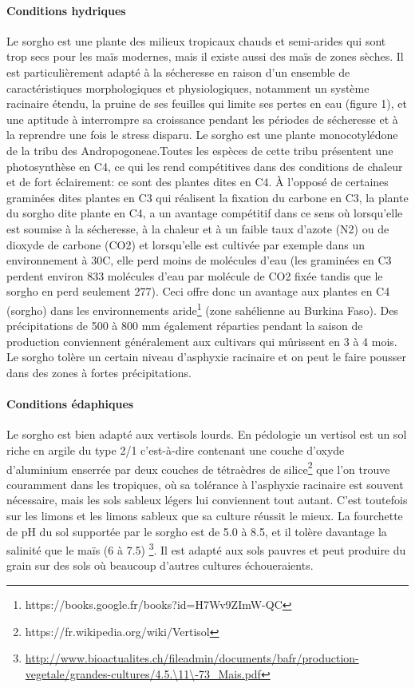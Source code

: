 \documentclass[a4paper,11pt]{article}
\begin{document}
\paragraph{Conditions hydriques} Le sorgho est une plante des milieux
tropicaux chauds et semi-arides qui sont trop secs pour les maïs
modernes, mais il existe aussi des maïs de zones sèches. Il est
particulièrement adapté à la sécheresse en raison d’un ensemble de
caractéristiques morphologiques et physiologiques, notamment un
système racinaire étendu, la pruine de ses feuilles qui limite ses
pertes en eau (figure 1), et une aptitude à interrompre sa
croissance pendant les périodes de sécheresse et à la reprendre une
fois le stress disparu. Le sorgho est une plante monocotylédone de la
tribu des Andropogoneae.Toutes les espèces de cette tribu présentent une photosynthèse en C4, ce qui les rend compétitives dans des conditions de chaleur et de fort éclairement: ce sont des plantes dites en C4. À l’opposé de certaines graminées dites plantes en C3 qui réalisent la fixation du carbone en C3, la plante du sorgho dite plante en C4, a un avantage compétitif dans ce sens où lorsqu’elle est soumise à la sécheresse, à la chaleur et à un faible taux d’azote (N2) ou de dioxyde de carbone (CO2) et lorsqu’elle est cultivée par exemple dans un environnement à 30\degree{}C, elle perd moins de molécules d’eau (les graminées en C3 perdent environ 833 molécules d’eau par molécule de CO2 fixée tandis que le sorgho en perd seulement 277). Ceci offre donc un
avantage aux plantes en C4 (sorgho) dans les environnements aride\footnote{https://books.google.fr/books?id=H7Wv9ZImW-QC}
(zone sahélienne au Burkina Faso). Des précipitations de 500 à 800 mm également réparties pendant la saison de production conviennent généralement aux cultivars qui mûrissent en 3 à 4 mois. Le sorgho
tolère un certain niveau d’asphyxie racinaire et on peut le faire
pousser dans des zones à fortes précipitations\cite{BARRO_KONDOMBO_2010}.

 
\paragraph{Conditions édaphiques}
Le sorgho est bien adapté aux vertisols lourds. En pédologie un vertisol
est un sol riche en argile du type 2/1
c’est-à-dire contenant une couche d’oxyde d’aluminium enserrée par deux couches de tétraèdres de
silice\footnote{https://fr.wikipedia.org/wiki/Vertisol} que l’on
trouve couramment dans les tropiques, où sa tolérance à l’asphyxie
racinaire est souvent nécessaire, mais les sols sableux légers lui
conviennent tout autant. C’est toutefois sur les limons et les limons
sableux que sa culture réussit le mieux. La fourchette de pH du sol
supportée par le sorgho est de 5.0 à 8.5, et il tolère davantage la
salinité que le maïs (6 à 7.5)
\footnote{\url{http://www.bioactualites.ch/fileadmin/documents/bafr/production-vegetale/grandes-cultures/4.5.\11\-73_Mais.pdf}}. Il est adapté aux sols pauvres et peut produire du grain sur des sols où beaucoup d’autres cultures échoueraients\cite{BARRO_KONDOMBO_2010}.
 
\end{document}
